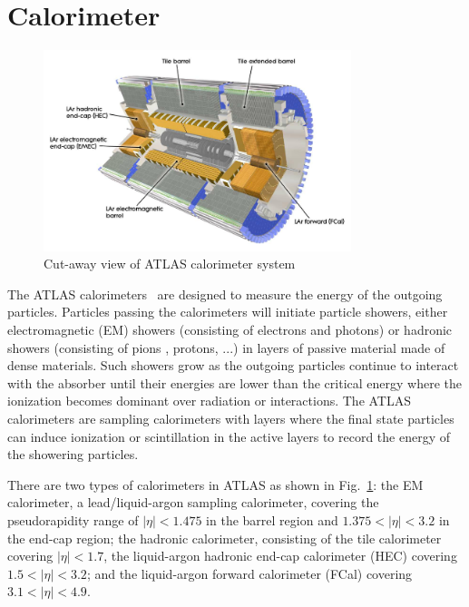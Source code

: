 \section{Calorimeter}
\label{sec:calo}
\begin{figure}[htbp]
    \centering
    \includegraphics[width=0.8\textwidth]{chapters/c4/figures/Calo}
    \caption{Cut-away view of ATLAS calorimeter system}
    \label{fig:Calo}
\end{figure}

\par The ATLAS calorimeters~\cite{CERN-LHCC-96-041} are designed to measure the energy of the outgoing particles. Particles passing the calorimeters will initiate particle showers, either electromagnetic (EM) showers (consisting of electrons and photons) or hadronic showers (consisting of pions , protons, ...) in layers of passive material made of dense materials. Such showers grow as the outgoing particles continue to interact with the absorber until their energies are lower than the critical energy where the ionization becomes dominant over radiation or interactions. The ATLAS calorimeters are sampling calorimeters with layers where the final state particles can induce ionization or scintillation in the active layers to record the energy of the showering particles.

\par There are two types of calorimeters in ATLAS as shown in Fig.~\ref{fig:Calo}: the EM calorimeter, a lead/liquid-argon sampling calorimeter, covering the pseudorapidity range of $|\eta| < 1.475$ in the barrel region and $1.375 < |\eta| < 3.2$ in the end-cap region; the hadronic calorimeter, consisting of the tile calorimeter covering $|\eta| < 1.7$, the liquid-argon hadronic end-cap calorimeter (HEC) covering $1.5 < |\eta| < 3.2$; and the liquid-argon forward calorimeter (FCal) covering $3.1 < |\eta| < 4.9$.

